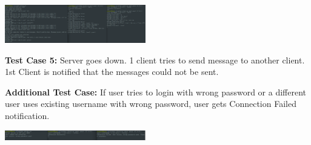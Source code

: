 \documentclass[10pt, pdftex, twocolumn]{report}
\begin{document}
	\includegraphics*[width=0.46\textwidth]{offline_chat.png}
	
	\textbf{Test Case 5:} Server goes down. 1 client tries to send message to another client. 1st Client is notified that the messages could not be sent.
	
	
	\textbf{Additional Test Case:} If user tries to login with wrong password or a different user uses existing username with wrong password, user gets Connection Failed notification.
	
	\includegraphics*[width=0.46\textwidth]{same-user.png}
	
	
	
	
\end{document}
